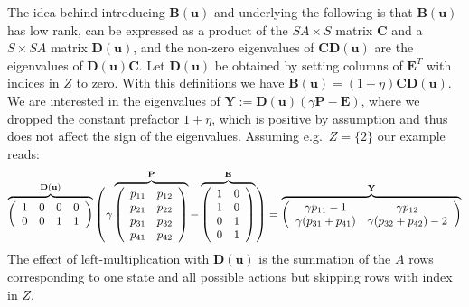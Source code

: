 \documentclass[a4paper,11pt]{article}
\newcommand{\vu}{{\mathbf u}}
\newcommand{\vY}{{\mathbf Y}}
\newcommand{\vB}{{\mathbf B}}
\newcommand{\vC}{{\mathbf C}}
\newcommand{\vD}{{\mathbf D}}
\newcommand{\vE}{{\mathbf E}}
\newcommand{\vP}{{\mathbf P}}
\begin{document}
The idea behind introducing $\vB(\vu)$ and underlying the following is that $\vB(\vu)$ has low rank, can be expressed as a product of the $SA\times S$ matrix $\vC$ and a $S\times SA$ matrix $\vD(\vu)$, and the non-zero eigenvalues of $\vC\vD(\vu)$ are the eigenvalues of $\vD(\vu)\vC$.
Let $\vD(\vu)$ be obtained by setting columns of $\vE^T$ with indices in $Z$ to zero. With this definitions we have $\vB(\vu) = (1+\eta) \vC \vD(\vu)$. 
We are interested in the eigenvalues of $\vY:=\vD(\vu)(\gamma\vP-\vE)$, where we dropped the constant prefactor $1+\eta$, which is positive by assumption and thus does not affect the sign of the eigenvalues. Assuming e.g.\ $Z=\{2\}$ our example reads:
\footnotesize%
\setlength{\arraycolsep}{3pt}
$$
\overbrace{
\left(
\begin{array}{cccc}
  1 & 0 & 0 & 0 \\
  0 & 0 & 1 & 1
\end{array}
\right) }^{\vD(\vu)}
\left(
 \vphantom{\begin{array}{c}\\\\\\\\\end{array}}
\right.\!\!\left.
\gamma
\overbrace{
\left(
\begin{array}{cc}
 p_{11} &  p_{12} \\
 p_{21} &  p_{22} \\
 p_{31} &  p_{32} \\
 p_{41} &  p_{42}
\end{array}
\right)}^{\vP}
-
\overbrace{
\left(
\begin{array}{cc}
  1 & 0 \\
  1 & 0 \\
  0 & 1 \\
  0 & 1
\end{array}
\right)}^{\vE}
\right.\!\!\left.
\vphantom{\begin{array}{c}\\\\\\\\\end{array}}
\right)
=
\overbrace{
\left(
\begin{array}{cc}
 \gamma p_{11}-1 & \gamma p_{12} \\
 \gamma (p_{31} +p_{41}) & \gamma (p_{32} +p_{42})-2
\end{array}
\right)
}^{\vY}
$$
\normalsize
The effect of left-multiplication with $\vD(\vu)$ is the summation of the $A$ rows corresponding to one state and all possible actions but skipping rows with index in $Z$. 
\end{document}
